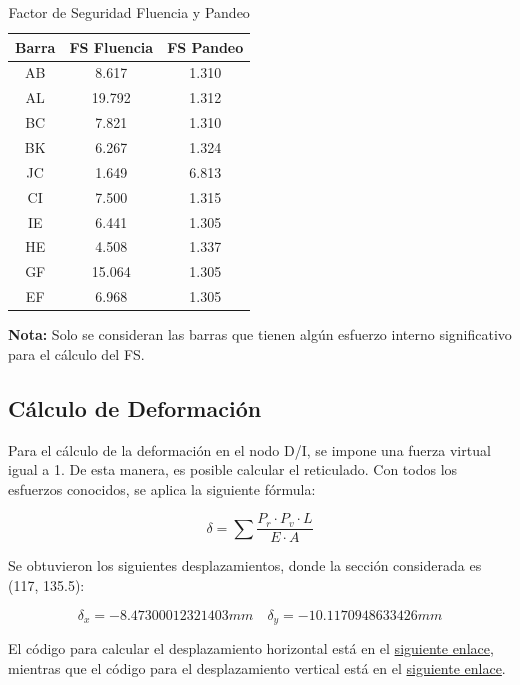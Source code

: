 \begin{table}[H]
\centering
\begin{tabular}{|c|c|c|}
\hline
\textbf{Barra} & \textbf{FS Fluencia} & \textbf{FS Pandeo} \\ 
\hline
AB & 8.617 & 1.310 \\ 
AL & 19.792 & 1.312 \\ 
BC & 7.821 & 1.310 \\ 
BK & 6.267 & 1.324 \\ 
JC & 1.649 & 6.813 \\ 
CI & 7.500 & 1.315 \\ 
IE & 6.441 & 1.305 \\ 
HE & 4.508 & 1.337 \\ 
GF & 15.064 & 1.305 \\ 
EF & 6.968 & 1.305 \\ 
\hline
\end{tabular}
\caption{Factor de Seguridad Fluencia y Pandeo}
\end{table}

\textbf{Nota:} Solo se consideran las barras que tienen algún esfuerzo interno significativo para el cálculo del FS.

\subsection{Cálculo de Deformación}

Para el cálculo de la deformación en el nodo D/I, se impone una fuerza virtual igual a 1. De esta manera, es posible calcular el reticulado. Con todos los esfuerzos conocidos, se aplica la siguiente fórmula:

\begin{equation}
    \delta = \sum   \frac{P_r \cdot P_v \cdot L}{E\cdot A}
\end{equation}

Se obtuvieron los siguientes desplazamientos, donde la sección considerada es (117, 135.5):

\begin{equation}
    \delta_x = -8.47300012321403 mm \quad \delta_y = -10.1170948633426 mm
\end{equation}

El código para calcular el desplazamiento horizontal está en el \href{https://github.com/LukasWolff2002/PROYECTO_3_MCOC/blob/main/CODIGO/CODIGO_MANUAL/desplazamiento_horizontal.py}{siguiente enlace}, mientras que el código para el desplazamiento vertical está en el \href{https://github.com/LukasWolff2002/PROYECTO_3_MCOC/blob/main/CODIGO/CODIGO_MANUAL/desplazamiento_vertical.py}{siguiente enlace}.

